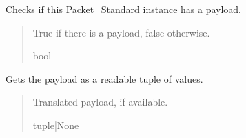 \documentclass[letterpaper,10pt,english]{sphinxmanual}
\begin{document}
\begin{fulllineitems}
\begin{fulllineitems}
\end{fulllineitems}


\begin{fulllineitems}
\label{\detokenize{PodApi.Packets:PodApi.Packets.Standard.PacketStandard.HasPayload}}
\pysigstartsignatures
{}
\pysigstopsignatures
\sphinxAtStartPar
Checks if this Packet\_Standard instance has a payload.
\begin{quote}\begin{description}
\sphinxAtStartPar
True if there is a payload, false otherwise.

\sphinxAtStartPar
bool

\end{description}\end{quote}

\end{fulllineitems}


\begin{fulllineitems}
\label{\detokenize{PodApi.Packets:PodApi.Packets.Standard.PacketStandard.Payload}}
\pysigstartsignatures
{}
\pysigstopsignatures
\sphinxAtStartPar
Gets the payload as a readable tuple of values.
\begin{quote}\begin{description}
\sphinxAtStartPar
Translated payload, if available.

\sphinxAtStartPar
tuple|None

\end{description}\end{quote}

\end{fulllineitems}



\end{fulllineitems}
\end{document}
